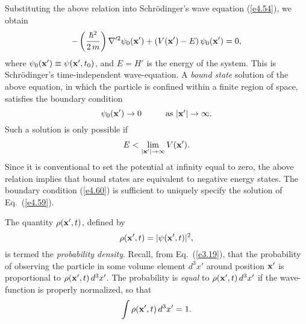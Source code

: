 Substituting the above relation into Schr\"{o}dinger's wave equation
(\ref{e4.54}), we
obtain
\begin{equation}\label{e4.59}
-\left(\frac{\hbar^2}{2\,m}\right)\nabla'^2\psi_0({\bf x'}) + 
(V({\bf x'})-E)\,\psi_0({\bf x'}) =0,
\end{equation}
where $\psi_0({\bf x'}) \equiv \psi({\bf x'}, t_0)$,
and $E= H'$ is the energy of the system. This is Schr\"{o}dinger's
time-independent wave-equation. A {\em bound state} solution of the
above equation, in which the particle is confined within a finite region
of space, satisfies the boundary condition
\begin{equation}\label{e4.60}
\psi_0({\bf x}') \rightarrow 0 \mbox{\hspace{1cm}as $|{\bf x}'|\rightarrow \infty$}.
\end{equation}
Such a solution is only possible if
\begin{equation}
E < \lim_{|{\bf x}'|\rightarrow \infty} V({\bf x'}).
\end{equation}
Since it is conventional to set the potential at infinity equal to zero, the above
relation implies that bound states are equivalent to negative energy states.
The boundary condition (\ref{e4.60}) is sufficient to uniquely specify the solution
of Eq.~(\ref{e4.59}).

The quantity $\rho({\bf x'}, t)$, defined by
\begin{equation}
\rho({\bf x'}, t) = |\psi({\bf x'}, t)|^2,
\end{equation}
is termed the {\em probability density}. Recall, from Eq.~(\ref{e3.19}), that the
probability of observing the particle in some volume element $d^3 x'$ 
around position ${\bf x'}$ is proportional to $\rho({\bf x'}, t)\,d^3 x'$.
The probability is {\em equal} to $\rho({\bf x'}, t)\,d^3 x'$ if the wave-function
is properly normalized, so that
\begin{equation}\label{e4.63}
\int \rho({\bf x'}, t)\, d^3 x' = 1.
\end{equation}

